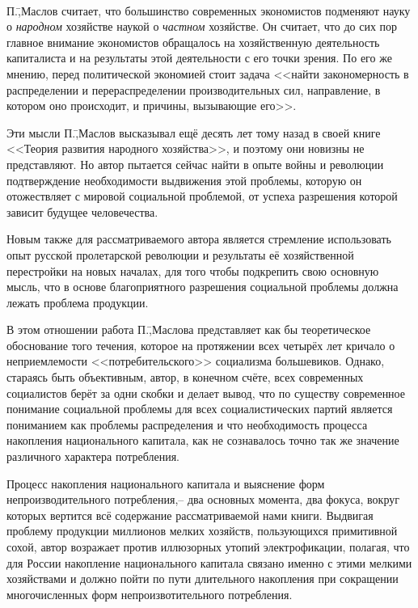 \begin{center}
 \noindent\textasteriskcentered\ \textasteriskcentered\ \textasteriskcentered
\end{center}

П.\=,Маслов считает, что большинство современных экономистов подменяют науку о \emph{народном} хозяйстве наукой о \emph{частном} хозяйстве. Он считает, что до сих пор главное внимание экономистов обращалось на хозяйственную деятельность капиталиста и на результаты этой деятельности с его точки зрения. По его же мнению, перед политической экономией стоит задача <<найти закономерность в распределении и перераспределении производительных сил, направление, в котором оно происходит, и причины, вызывающие его>>.

Эти мысли П.\=,Маслов высказывал ещё десять лет тому назад в своей книге <<Теория развития народного хозяйства>>, и поэтому они новизны не представляют. Но автор пытается сейчас найти в опыте войны и революции подтверждение необходимости выдвижения этой проблемы, которую он отожествляет с мировой социальной проблемой, от успеха разрешения которой зависит будущее человечества.

Новым также для рассматриваемого автора является стремление использовать опыт русской пролетарской революции и результаты её хозяйственной перестройки на новых началах, для того чтобы подкрепить свою основную мысль, что в основе благоприятного разрешения социальной проблемы должна лежать проблема продукции.

В этом отношении работа П.\=,Маслова представляет как бы теоретическое обоснование того течения, которое на протяжении всех четырёх лет кричало о неприемлемости <<потребительского>> социализма большевиков. Однако, стараясь быть объективным, автор, в конечном счёте, всех современных социалистов берёт за одни скобки и делает вывод, что по существу современное понимание социальной проблемы для всех социалистических партий является пониманием как проблемы распределения и что необходимость процесса накопления национального капитала, как не сознавалось точно так же значение различного характера потребления.

Процесс накопления национального капитала и выяснение форм непроизводительного потребления,\--- два основных момента, два фокуса, вокруг которых вертится всё содержание рассматриваемой нами книги. Выдвигая проблему продукции миллионов мелких хозяйств, пользующихся примитивной сохой, автор возражает против иллюзорных утопий электрофикации, полагая, что для России накопление национального капитала связано именно с этими мелкими хозяйствами и должно пойти по пути длительного накопления при сокращении многочисленных форм непроизвотительного потребления.

